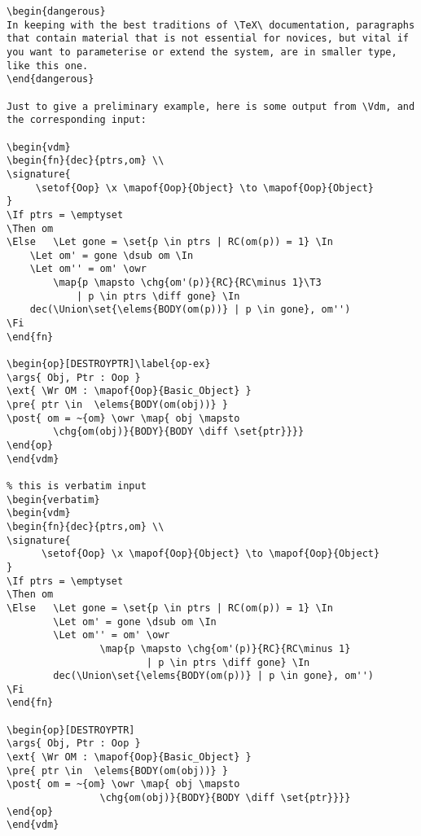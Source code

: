 {\begin{verbatim}
\begin{dangerous}
In keeping with the best traditions of \TeX\ documentation, paragraphs
that contain material that is not essential for novices, but vital if
you want to parameterise or extend the system, are in smaller type,
like this one.
\end{dangerous}

Just to give a preliminary example, here is some output from \Vdm, and
the corresponding input:

\begin{vdm}
\begin{fn}{dec}{ptrs,om} \\
\signature{
	 \setof{Oop} \x \mapof{Oop}{Object} \to \mapof{Oop}{Object} 
}
\If ptrs = \emptyset
\Then om
\Else 	\Let gone = \set{p \in ptrs | RC(om(p)) = 1} \In
	\Let om' = gone \dsub om \In
	\Let om'' = om' \owr
		\map{p \mapsto \chg{om'(p)}{RC}{RC\minus 1}\T3
			| p \in ptrs \diff gone} \In
	dec(\Union\set{\elems{BODY(om(p))} | p \in gone}, om'')
\Fi
\end{fn}

\begin{op}[DESTROYPTR]\label{op-ex}
\args{ Obj, Ptr : Oop }
\ext{ \Wr OM : \mapof{Oop}{Basic_Object} }
\pre{ ptr \in  \elems{BODY(om(obj))} }
\post{ om = ~{om} \owr \map{ obj \mapsto 
		\chg{om(obj)}{BODY}{BODY \diff \set{ptr}}}}
\end{op}
\end{vdm}

% this is verbatim input
\begin{verbatim}
\begin{vdm}
\begin{fn}{dec}{ptrs,om} \\
\signature{
      \setof{Oop} \x \mapof{Oop}{Object} \to \mapof{Oop}{Object} 
}
\If ptrs = \emptyset
\Then om
\Else   \Let gone = \set{p \in ptrs | RC(om(p)) = 1} \In
        \Let om' = gone \dsub om \In
        \Let om'' = om' \owr
                \map{p \mapsto \chg{om'(p)}{RC}{RC\minus 1}
                        | p \in ptrs \diff gone} \In
        dec(\Union\set{\elems{BODY(om(p))} | p \in gone}, om'')
\Fi
\end{fn}

\begin{op}[DESTROYPTR]
\args{ Obj, Ptr : Oop }
\ext{ \Wr OM : \mapof{Oop}{Basic_Object} }
\pre{ ptr \in  \elems{BODY(om(obj))} }
\post{ om = ~{om} \owr \map{ obj \mapsto 
                \chg{om(obj)}{BODY}{BODY \diff \set{ptr}}}}
\end{op}
\end{vdm}


\end{verbatim}}
